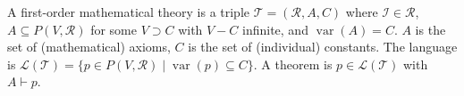 A first-order mathematical theory is a triple $\mathcal{T} = (\mathcal{R}, A, C)$ where $\mathcal{I} \in \mathcal{R}$, $A \subseteq P(V, \mathcal{R})$ for some $V \supset C$ with $V - C$ infinite, and $\operatorname{var}(A) = C$. $A$ is the set of (mathematical) axioms, $C$ is the set of (individual) constants. The language is $\mathcal{L}(\mathcal{T}) = \{p \in P(V, \mathcal{R}) \mid \operatorname{var}(p) \subseteq C\}$. A theorem is $p \in \mathcal{L}(\mathcal{T})$ with $A \vdash p$.
